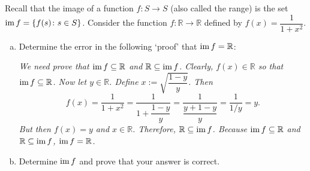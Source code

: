 \documentclass[11pt,letterpaper]{article}
\begin{document}
\newpage





 Recall that the image of a function $f: S \to S$ (also called the range) is the set $\operatorname{im} f= \{ f(s) \colon s \in S \}$. Consider the function $f: \mathbb{R} \to \mathbb{R}$ defined by $f(x)= \dfrac{1}{1 + x^2}$. 
\begin{enumerate}[(a)]
\item Determine the error in the following `proof' that $\operatorname{im} f= \mathbb{R}$: \pspace

{\itshape We need prove that $\operatorname{im} f \subseteq \mathbb{R}$ and $\mathbb{R} \subseteq \operatorname{im} f$. Clearly, $f(x) \in \mathbb{R}$ so that $\operatorname{im} f \subseteq \mathbb{R}$. Now let $y \in \mathbb{R}$. Define $x:= \sqrt{\dfrac{1 - y}{y}}$. Then
	\[
	f(x)= \dfrac{1}{1 + x^2}= \dfrac{1}{1 + \dfrac{1 - y}{y}}= \dfrac{1}{\dfrac{y + 1 - y}{y}}= \dfrac{1}{1/y}= y.
	\]
But then $f(x)= y$ and $x \in \mathbb{R}$. Therefore, $\mathbb{R} \subseteq \operatorname{im} f$. Because $\operatorname{im} f \subseteq \mathbb{R}$ and $\mathbb{R} \subseteq \operatorname{im} f$, $\operatorname{im} f = \mathbb{R}$.}

\item Determine $\operatorname{im} f$ and prove that your answer is correct. 
\end{enumerate}
\end{document}
